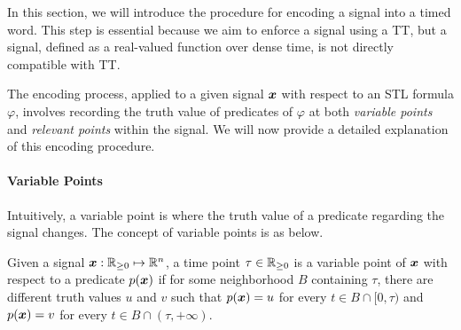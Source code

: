                      
    In this section, we will introduce the procedure for encoding a signal into a timed word. This step is essential because we aim to enforce a signal using a TT, but a signal, defined as a real-valued function over dense time, is not directly compatible with TT. 
    
    The encoding process, applied to a given signal $\bm{x}$ with respect to an STL formula $\varphi$, involves recording the truth value of predicates of $\varphi$ at both \emph{variable points} and \emph{relevant points} within the signal. We will now provide a detailed explanation of this encoding procedure.

    \paragraph{Variable Points}
    Intuitively, a variable point is where the truth value of a predicate regarding the signal changes.
        The concept of variable points is as below.
        \begin{definition}
            Given a signal $\bm{x}:\mathbb{R}_{\ge 0} \mapsto \mathbb{R}^n$, a time point $\tau\in \mathbb{R}_{\ge 0}$ is a variable point of $\bm{x}$ with respect to a predicate $p(\bm{x})$ if for some neighborhood $B$ containing $\tau$, there are different truth values $u$ and $v$ such that $p(\bm{x})=u$ for every $t\in B\cap [0,\tau)$ and $p(\bm{x})=v$ for every $t\in B\cap (\tau,+\infty)$.
        \end{definition} 


